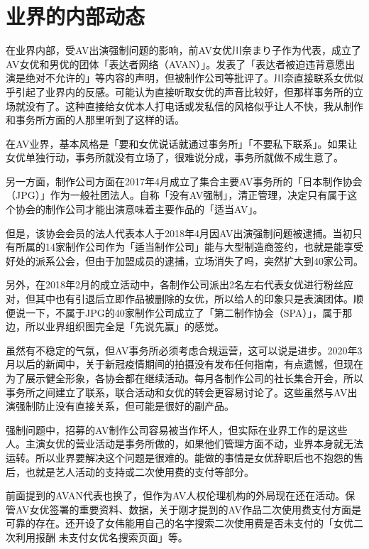\documentclass[12pt,UTF8]{ctexbook}
\begin{document}
\switchcolumn

\section{业界的内部动态}

在业界内部，受AV出演强制问题的影响，前AV女优川奈まり子作为代表，成立了AV女优和男优的团体「表达者网络（AVAN）」。发表了「表达者被迫违背意愿出演是绝对不允许的」等内容的声明，但被制作公司等批评了。川奈直接联系女优似乎引起了业界内的反感。可能认为直接听取女优的声音比较好，但那样事务所的立场就没有了。这种直接给女优本人打电话或发私信的风格似乎让人不快，我从制作和事务所方面的人那里听到了这样的话。

在AV业界，基本风格是「要和女优说话就通过事务所」「不要私下联系」。如果让女优单独行动，事务所就没有立场了，很难说分成，事务所就做不成生意了。

另一方面，制作公司方面在2017年4月成立了集合主要AV事务所的「日本制作协会（JPG）」作为一般社团法人。自称「没有AV强制」，清正管理，决定只有属于这个协会的制作公司才能出演意味着主要作品的「适当AV」。

但是，该协会会员的法人代表本人于2018年4月因AV出演强制问题被逮捕。当初只有所属的14家制作公司作为「适当制作公司」能与大型制造商签约，也就是能享受好处的派系公会，但由于加盟成员的逮捕，立场消失了吗，突然扩大到40家公司。

另外，在2018年2月的成立活动中，各制作公司派出2名左右代表女优进行粉丝应对，但其中也有引退后立即作品被删除的女优，所以给人的印象只是表演团体。顺便说一下，不属于JPG的40家制作公司成立了「第二制作协会（SPA）」，属于那边，所以业界组织图完全是「先说先赢」的感觉。

虽然有不稳定的气氛，但AV事务所必须考虑合规运营，这可以说是进步。2020年3月以后的新闻中，关于新冠疫情期间的拍摄没有发布任何指南，有点遗憾，但现在为了展示健全形象，各协会都在继续活动。每月各制作公司的社长集合开会，所以事务所之间建立了联系，联合活动和女优的转会更容易讨论了。这些虽然与AV出演强制防止没有直接关系，但可能是很好的副产品。

强制问题中，招募的AV制作公司容易被当作坏人，但实际在业界工作的是这些人。主演女优的营业活动是事务所做的，如果他们管理方面不动，业界本身就无法运转。所以业界要解决这个问题是很难的。能做的事情是女优辞职后也不抱怨的售后，也就是艺人活动的支持或二次使用费的支付等部分。

前面提到的AVAN代表也换了，但作为AV人权伦理机构的外局现在还在活动。保管AV女优签署的重要资料、数据，关于刚才提到的AV作品二次使用费支付方面是可靠的存在。还开设了女伟能用自己的名字搜索二次使用费是否未支付的「女优二次利用报酬 未支付女优名搜索页面」等。
\end{document}
